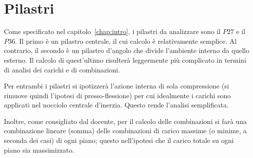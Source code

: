 \chapter{Pilastri}\label{chap:columns}
Come specificato nel capitolo~\ref{chap:intro}, i pilastri da analizzare sono il $P27$ e il $P36$. Il primo è un pilastro centrale, il cui calcolo è relativamente semplice. Al contrario, il secondo è un pilastro d'angolo che divide l'ambiente interno da quello esterno. Il calcolo di quest'ultimo risulterà leggermente più complicato in termini di analisi dei carichi e di combinazioni. 

Per entrambi i pilastri si ipotizzerà l'azione interna di sola compressione (si rimuove quindi l'ipotesi di presso-flessione) per cui idealmente i carichi sono applicati nel nocciolo centrale d'inerzia. Questo rende l'analisi semplificata.

Inoltre, come consigliato dal docente, per il calcolo delle combinazioni si farà una combinazione lineare (somma) delle combinazioni di carico massime (o minime, a seconda dei casi) di ogni piano; questo nell'ipotesi che il carico totale su ogni piano sia massimizzato.

